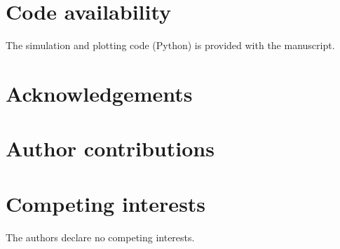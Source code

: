 \documentclass[10pt,twocolumn,a4paper]{article}
\begin{document}
\section{Code availability}
The simulation and plotting code (Python) is provided with the manuscript. 

{\small


}

\section{Acknowledgements}

\section{Author contributions}

\section{Competing interests}
The authors declare no competing interests. 
\end{document}
